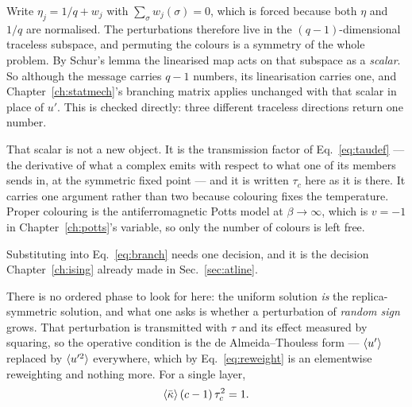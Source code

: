 Write $\eta_{j}=1/q+w_{j}$ with $\sum_{\sigma}w_{j}(\sigma)=0$, which is forced
because both $\eta$ and $1/q$ are normalised. The perturbations therefore live
in the $(q-1)$-dimensional traceless subspace, and permuting the colours is a
symmetry of the whole problem. By Schur's lemma the linearised map acts on that
subspace as a \emph{scalar}. So although the message carries $q-1$ numbers, its
linearisation carries one, and Chapter~\ref{ch:statmech}'s branching matrix
applies unchanged with that scalar in place of $u'$. This is checked directly:
three different traceless directions return one number.

That scalar is not a new object. It is the transmission factor of
Eq.~\eqref{eq:taudef} --- the derivative of what a complex emits with respect
to what one of its members sends in, at the symmetric fixed point --- and it is
written $\tau_{c}$ here as it is there. It carries one argument rather than two
because colouring fixes the temperature. Proper colouring is the
antiferromagnetic Potts model at $\beta\to\infty$, which is $v=-1$ in
Chapter~\ref{ch:potts}'s variable, so only the number of colours is left free.

Substituting into Eq.~\eqref{eq:branch} needs one decision, and it is the
decision Chapter~\ref{ch:ising} already made in Sec.~\ref{sec:atline}.

There is no ordered phase to look for here: the uniform solution \emph{is} the
replica-symmetric solution, and what one asks is whether a perturbation of
\emph{random sign} grows. That perturbation is transmitted with $\tau$ and its
effect measured by squaring, so the operative condition is the de
Almeida--Thouless form --- $\langle u' \rangle$ replaced by $\langle u'^{2} \rangle$ everywhere,
which by Eq.~\eqref{eq:reweight} is an elementwise reweighting and nothing more.
For a single layer,
\begin{equation}
  \langle \bar\kappa \rangle\,(c-1)\,\tau_{c}^{2}=1.
  \label{eq:colthresh}
\end{equation}

